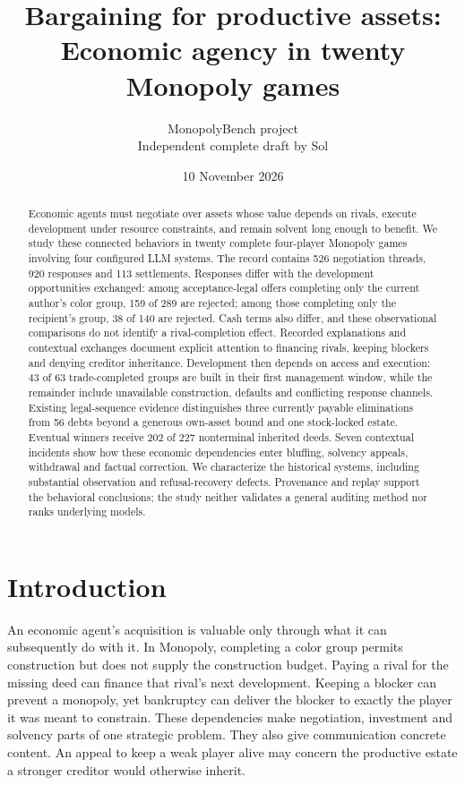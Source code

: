 \documentclass[11pt,letterpaper]{article}
\title{Bargaining for productive assets:\\Economic agency in twenty Monopoly games}
\author{MonopolyBench project\\Independent complete draft by Sol}
\date{10 November 2026}
\begin{document}

\maketitle
\begin{abstract}
Economic agents must negotiate over assets whose value depends on rivals, execute development under resource constraints, and remain solvent long enough to benefit. We study these connected behaviors in twenty complete four-player Monopoly games involving four configured LLM systems. The record contains 526 negotiation threads, 920 responses and 113 settlements. Responses differ with the development opportunities exchanged: among acceptance-legal offers completing only the current author's color group, 159 of 289 are rejected; among those completing only the recipient's group, 38 of 140 are rejected. Cash terms also differ, and these observational comparisons do not identify a rival-completion effect. Recorded explanations and contextual exchanges document explicit attention to financing rivals, keeping blockers and denying creditor inheritance. Development then depends on access and execution: 43 of 63 trade-completed groups are built in their first management window, while the remainder include unavailable construction, defaults and conflicting response channels. Existing legal-sequence evidence distinguishes three currently payable eliminations from 56 debts beyond a generous own-asset bound and one stock-locked estate. Eventual winners receive 202 of 227 nonterminal inherited deeds. Seven contextual incidents show how these economic dependencies enter bluffing, solvency appeals, withdrawal and factual correction. We characterize the historical systems, including substantial observation and refusal-recovery defects. Provenance and replay support the behavioral conclusions; the study neither validates a general auditing method nor ranks underlying models.
\end{abstract}

\section{Introduction}

An economic agent's acquisition is valuable only through what it can subsequently do with it. In Monopoly, completing a color group permits construction but does not supply the construction budget. Paying a rival for the missing deed can finance that rival's next development. Keeping a blocker can prevent a monopoly, yet bankruptcy can deliver the blocker to exactly the player it was meant to constrain. These dependencies make negotiation, investment and solvency parts of one strategic problem. They also give communication concrete content. An appeal to keep a weak player alive may concern the productive estate a stronger creditor would otherwise inherit.
\end{document}
